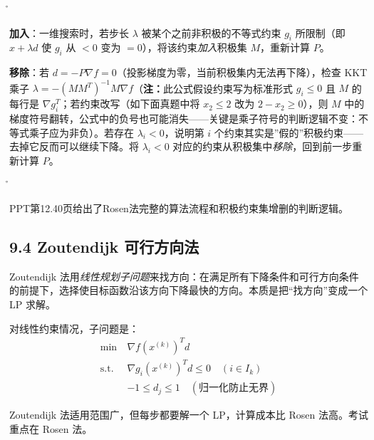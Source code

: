 \r{}

\textbf{加入}：一维搜索时，若步长 $\lambda$ 被某个之前非积极的不等式约束 $g_i$ 所限制（即 $x + \lambda d$ 使 $g_i$ 从 $<0$ 变为 $=0$），将该约束\emph{加入}积极集 $M$，重新计算 $P$。

\textbf{移除}：若 $d = -P\nabla f = 0$（投影梯度为零，当前积极集内无法再下降），检查 KKT 乘子 $\lambda = -(MM^T)^{-1}M \nabla f$（\textbf{注：}此公式假设约束写为标准形式 $g_i\le0$ 且 $M$ 的每行是 $\nabla g_i^T$；若约束改写（如下面真题中将 $x_2\le2$ 改为 $2-x_2\ge0$），则 $M$ 中的梯度符号翻转，公式中的负号也可能消失——关键是乘子符号的判断逻辑不变：不等式乘子应为非负）。若存在 $\lambda_i < 0$，说明第 $i$ 个约束其实是”假的”积极约束——去掉它反而可以继续下降。将 $\lambda_i < 0$ 对应的约束从积极集中\emph{移除}，回到前一步重新计算 $P$。

\r{}

PPT第12.40页给出了Rosen法完整的算法流程和积极约束集增删的判断逻辑。

\medskip
{}
\medskip

\subsection{9.4 Zoutendijk 可行方向法}

Zoutendijk 法用\emph{线性规划子问题}来找方向：在满足所有下降条件和可行方向条件的前提下，选择使目标函数沿该方向下降最快的方向。本质是把“找方向”变成一个 LP 求解。

对线性约束情况，子问题是：
\[
\begin{aligned}
\min\ & \nabla f(x^{(k)})^T d \\
\text{s.t.}\ & \nabla g_i(x^{(k)})^T d \le 0 \quad (i \in I_k) \\
& -1 \le d_j \le 1 \quad (\text{归一化防止无界})
\end{aligned}
\]

Zoutendijk 法适用范围广，但每步都要解一个 LP，计算成本比 Rosen 法高。考试重点在 Rosen 法。



